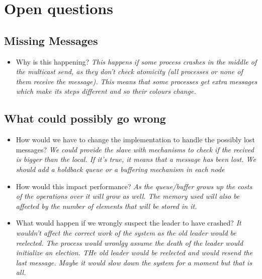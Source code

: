 \clearpage
\section{Open questions}

\subsection{Missing Messages}
\begin{itemize}
\item Why is this happening?
\newline\textit{This happens if some process crashes in the middle of the multicast send, as they don’t check atomicity (all processes or none of them receive the message). \newline This means that some processes get extra messages which make its steps different and so their colours change.
}
\end{itemize}

\subsection{What could possibly go wrong}
\begin{itemize}
\item How would we have to change the implementation to handle the possibly lost messages? 
\newline\textit{We could provide the slave with mechanisms to check if the recived  is bigger than the local. If it's true, it means that a message has been lost. We should add a holdback queue or a buffering mechanism in each node}

\item How would this impact performance? 
\newline\textit{As the queue/buffer grows up the costs of the operations over it will grow as well. The memory used will also be affected by the number of elements that will be stored in it.}

\item What would happen if we wrongly suspect the leader to have crashed?
\newline\textit{It wouldn't affect the correct work of the system as the old leader would be reelected.}
\newline\textit{The process would wronlgy assume the death of the leader would initialize an election. THe old leader would be reelected and would resend the last message. Maybe it would slow down the system for a moment but that is all.}
\end{itemize}

